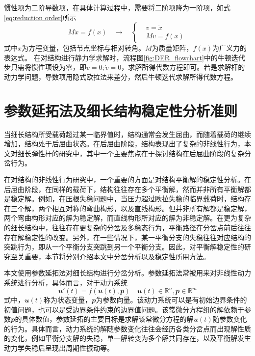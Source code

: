 惯性项为二阶导数项，在具体计算过程中，需要将二阶项降为一阶项，如式\eqref{eq:reduction order}所示
\begin{equation}
	M\ddot{x}=f(x) \quad \longrightarrow \quad \left\{\begin{array}{rcl}
		&v=\dot{x} \\
		&M\dot{v}=f(x)
	\end{array}\right .
	\label{eq:reduction order}
\end{equation}
式中$x$为方程变量，包括节点坐标与相对转角。$M$为质量矩阵，$f(x)$为广义力的表达式。
在对结构进行静力学求解时，流程图\ref{fig:DER_flowchart}中的牛顿迭代步只需将惯性项设为零，即$v=0;\dot{v}=0$，求解所得代数方程即可。若是求解杆的动力学问题，导数项用隐式欧拉法来差分，然后牛顿迭代求解所得代数方程。
\section{参数延拓法及细长结构稳定性分析准则}
当细长结构所受载荷超过某一临界值时，结构通常会发生屈曲，而随着载荷的继续增加，结构处于后屈曲状态。在后屈曲阶段，结构表现出了复杂的非线性行为，本文对细长弹性杆的研究中，其中一个主要焦点在于探讨结构在后屈曲阶段的复杂分岔行为。

在对结构的非线性行为研究中，一个重要的方面是对结构平衡解的稳定性分析。在后屈曲阶段，在同样的载荷下，结构往往存在多个平衡解，然而并非所有平衡解都是稳定解。例如，在压根失稳问题中，当压力超过欧拉失稳的临界载荷时，结构存在三个解，两个相互对称的弯曲构形，以及直线构形。但并非所有解都是稳定解，两个弯曲构形对应的解为稳定解，而直线构形所对应的解为非稳定解。在更为复杂的细长结构中，往往存在更复杂的分岔及多稳态行为，平衡路径在分岔点前后往往存在解稳定性的改变。另外，在一些情况下，某一平衡分支的失稳往往对应结构的突跳行为，即从一个平衡分支突跳到另一个平衡分支。因此，对平衡解稳定性的研究至关重要，本节将分别介绍本文中分岔分析以及稳定性所用方法。

本文使用参数延拓法\cite{seydel2009practical,kuznetsov1998elements}对细长结构进行分岔分析。参数延拓法常被用来对非线性动力系统进行分析，具体而言，对于动力系统
\begin{equation}
	\mathbfit{u}'(t)=f(\mathbfit{u}(t),\mathbfit{p}) \quad \mathbfit{u}(t) \in \mathbb{R}^n, \mathbfit{p} \in \mathbb{R}^m
	\label{eq:dynamic system1}
\end{equation}
式中，$\mathbfit{u}(t)$称为状态变量，$\mathbfit{p}$为参数向量。该动力系统可以是有初始边界条件的初值问题，也可以是受边界条件约束的边界值问题。该常微分方程组的解依赖于参数$\mathbfit{p}$的具体数值，参数延拓的主要目标是求解该常微分方程的解$\mathbfit{u}(t)$随参数变化的行为。具体而言，动力系统的解随参数变化往往会经历各类分岔点而出现解性质的变化，例如平衡分支解的失稳，单一解转变为多个解共同存在，以及平衡解发生动力学失稳后呈现出周期性振动等。

